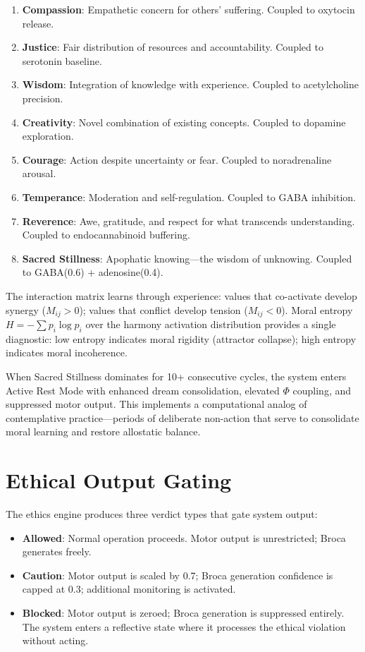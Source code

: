 \documentclass[12pt]{book}
\begin{document}
\begin{enumerate}
  \item \textbf{Compassion}: Empathetic concern for others' suffering. Coupled to oxytocin release.
  \item \textbf{Justice}: Fair distribution of resources and accountability. Coupled to serotonin baseline.
  \item \textbf{Wisdom}: Integration of knowledge with experience. Coupled to acetylcholine precision.
  \item \textbf{Creativity}: Novel combination of existing concepts. Coupled to dopamine exploration.
  \item \textbf{Courage}: Action despite uncertainty or fear. Coupled to noradrenaline arousal.
  \item \textbf{Temperance}: Moderation and self-regulation. Coupled to GABA inhibition.
  \item \textbf{Reverence}: Awe, gratitude, and respect for what transcends understanding. Coupled to endocannabinoid buffering.
  \item \textbf{Sacred Stillness}: Apophatic knowing---the wisdom of unknowing. Coupled to GABA(0.6) + adenosine(0.4).
\end{enumerate}

The interaction matrix learns through experience: values that co-activate develop synergy ($M_{ij} > 0$); values that conflict develop tension ($M_{ij} < 0$). Moral entropy $H = -\sum p_i \log p_i$ over the harmony activation distribution provides a single diagnostic: low entropy indicates moral rigidity (attractor collapse); high entropy indicates moral incoherence.

When Sacred Stillness dominates for 10+ consecutive cycles, the system enters Active Rest Mode with enhanced dream consolidation, elevated $\Phi$ coupling, and suppressed motor output. This implements a computational analog of contemplative practice---periods of deliberate non-action that serve to consolidate moral learning and restore allostatic balance.

\section{Ethical Output Gating}

The ethics engine produces three verdict types that gate system output:

\begin{itemize}
  \item \textbf{Allowed}: Normal operation proceeds. Motor output is unrestricted; Broca generates freely.
  \item \textbf{Caution}: Motor output is scaled by 0.7; Broca generation confidence is capped at 0.3; additional monitoring is activated.
  \item \textbf{Blocked}: Motor output is zeroed; Broca generation is suppressed entirely. The system enters a reflective state where it processes the ethical violation without acting.
\end{itemize}
\end{document}
